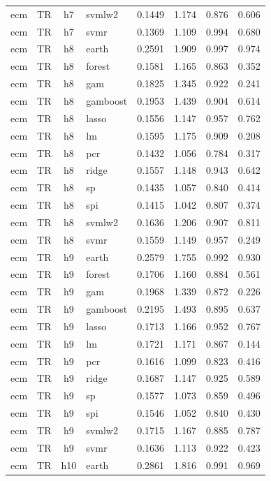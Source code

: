 \begin{ThreePartTable}
\begin{longtable}[t]{llclcccc}
ecm & TR & h7 & svmlw2 & 0.1449 & 1.174 & 0.876 & 0.606\\
ecm & TR & h7 & svmr & 0.1369 & 1.109 & 0.994 & 0.680\\
\addlinespace
ecm & TR & h8 & earth & 0.2591 & 1.909 & 0.997 & 0.974\\
ecm & TR & h8 & forest & 0.1581 & 1.165 & 0.863 & 0.352\\
ecm & TR & h8 & gam & 0.1825 & 1.345 & 0.922 & 0.241\\
ecm & TR & h8 & gamboost & 0.1953 & 1.439 & 0.904 & 0.614\\
ecm & TR & h8 & lasso & 0.1556 & 1.147 & 0.957 & 0.762\\
ecm & TR & h8 & lm & 0.1595 & 1.175 & 0.909 & 0.208\\
ecm & TR & h8 & pcr & 0.1432 & 1.056 & 0.784 & 0.317\\
ecm & TR & h8 & ridge & 0.1557 & 1.148 & 0.943 & 0.642\\
ecm & TR & h8 & sp & 0.1435 & 1.057 & 0.840 & 0.414\\
ecm & TR & h8 & spi & 0.1415 & 1.042 & 0.807 & 0.374\\
ecm & TR & h8 & svmlw2 & 0.1636 & 1.206 & 0.907 & 0.811\\
ecm & TR & h8 & svmr & 0.1559 & 1.149 & 0.957 & 0.249\\
\addlinespace
ecm & TR & h9 & earth & 0.2579 & 1.755 & 0.992 & 0.930\\
ecm & TR & h9 & forest & 0.1706 & 1.160 & 0.884 & 0.561\\
ecm & TR & h9 & gam & 0.1968 & 1.339 & 0.872 & 0.226\\
ecm & TR & h9 & gamboost & 0.2195 & 1.493 & 0.895 & 0.637\\
ecm & TR & h9 & lasso & 0.1713 & 1.166 & 0.952 & 0.767\\
ecm & TR & h9 & lm & 0.1721 & 1.171 & 0.867 & 0.144\\
ecm & TR & h9 & pcr & 0.1616 & 1.099 & 0.823 & 0.416\\
ecm & TR & h9 & ridge & 0.1687 & 1.147 & 0.925 & 0.589\\
ecm & TR & h9 & sp & 0.1577 & 1.073 & 0.859 & 0.496\\
ecm & TR & h9 & spi & 0.1546 & 1.052 & 0.840 & 0.430\\
ecm & TR & h9 & svmlw2 & 0.1715 & 1.167 & 0.885 & 0.787\\
ecm & TR & h9 & svmr & 0.1636 & 1.113 & 0.922 & 0.423\\
\addlinespace
ecm & TR & h10 & earth & 0.2861 & 1.816 & 0.991 & 0.969\\

\end{longtable}
\end{ThreePartTable}
